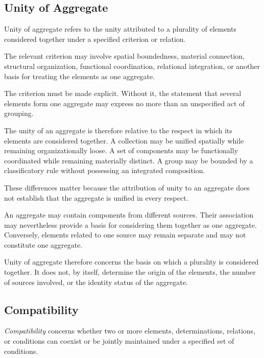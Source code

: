 \subsection{Unity of Aggregate}

Unity of aggregate refers to the unity attributed
to a plurality of elements considered together
under a specified criterion or relation.

The relevant criterion may involve spatial
boundedness, material connection, structural
organization, functional coordination,
relational integration, or another basis
for treating the elements as one aggregate.

The criterion must be made explicit. Without
it, the statement that several elements form
one aggregate may express no more than an
unspecified act of grouping.

The unity of an aggregate is therefore
relative to the respect in which its elements
are considered together. A collection may
be unified spatially while remaining
organizationally loose. A set of components
may be functionally coordinated while
remaining materially distinct. A group
may be bounded by a classificatory rule
without possessing an integrated composition.

These differences matter because the attribution
of unity to an aggregate does not establish
that the aggregate is unified in every respect.

An aggregate may contain components from
different sources. Their association may
nevertheless provide a basis for considering
them together as one aggregate. Conversely,
elements related to one source may remain
separate and may not constitute one aggregate.

Unity of aggregate therefore concerns the
basis on which a plurality is considered
together. It does not, by itself, determine
the origin of the elements, the number of
sources involved, or the identity status
of the aggregate.


\subsection{Compatibility}

\emph{Compatibility} concerns whether two
or more elements, determinations, relations,
or conditions can coexist or be jointly
maintained under a specified set of conditions.

